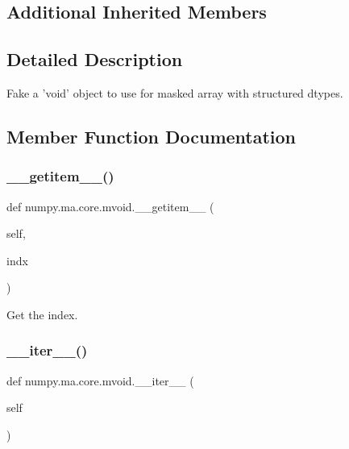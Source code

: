 \subsection*{Additional Inherited Members}


\subsection{Detailed Description}
\begin{DoxyVerb}Fake a 'void' object to use for masked array with structured dtypes.
\end{DoxyVerb}
 

\subsection{Member Function Documentation}
\mbox{\label{classnumpy_1_1ma_1_1core_1_1mvoid_a9a8326bef4d36b355d9a59add90be30e}} 
\subsubsection{\texorpdfstring{\+\_\+\+\_\+getitem\+\_\+\+\_\+()}{\_\_getitem\_\_()}}
{\footnotesize\ttfamily def numpy.\+ma.\+core.\+mvoid.\+\_\+\+\_\+getitem\+\_\+\+\_\+ (\begin{DoxyParamCaption}\item[{}]{self,  }\item[{}]{indx }\end{DoxyParamCaption})}

\begin{DoxyVerb}Get the index.\end{DoxyVerb}
 \mbox{\label{classnumpy_1_1ma_1_1core_1_1mvoid_aa85116bacfc8fc1fc028039a9637c190}} 
\subsubsection{\texorpdfstring{\+\_\+\+\_\+iter\+\_\+\+\_\+()}{\_\_iter\_\_()}}
{\footnotesize\ttfamily def numpy.\+ma.\+core.\+mvoid.\+\_\+\+\_\+iter\+\_\+\+\_\+ (\begin{DoxyParamCaption}\item[{}]{self }\end{DoxyParamCaption})}

